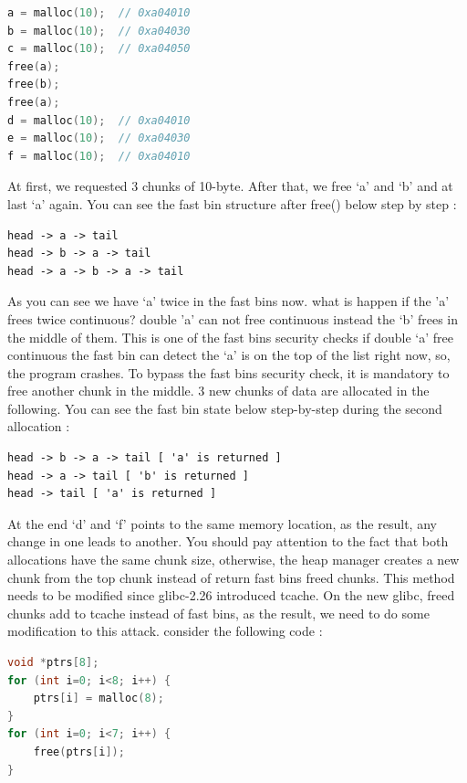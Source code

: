\documentclass{masterthesis}
\newcommand*\libc{glibc}
\begin{document}
\begin{lstlisting}[language=c,frame=tlrb]
a = malloc(10);  // 0xa04010
b = malloc(10);  // 0xa04030
c = malloc(10);  // 0xa04050
free(a);
free(b); 
free(a);
d = malloc(10);  // 0xa04010
e = malloc(10);  // 0xa04030
f = malloc(10);  // 0xa04010
\end{lstlisting}

At first, we requested 3 chunks of 10-byte. After that, we free ‘a’ and ‘b’ and at last ‘a' again. You can see the fast bin structure after free() below step by step :

\begin{lstlisting}[frame=tlrb]
head -> a -> tail
head -> b -> a -> tail
head -> a -> b -> a -> tail
\end{lstlisting}

As you can see we have ‘a’ twice in the fast bins now. what is happen if the 'a' frees twice continuous? double 'a' can not free continuous instead the ‘b’ frees in the middle of them. This is one of the fast bins security checks if double ‘a’ free continuous the fast bin can detect the ‘a’ is on the top of the list right now, so, the program crashes. To bypass the fast bins security check, it is mandatory to free another chunk in the middle. 3 new chunks of data are allocated in the following. You can see the fast bin state below step-by-step during the second allocation :

\begin{lstlisting}[frame=tlrb]
head -> b -> a -> tail [ 'a' is returned ]
head -> a -> tail [ 'b' is returned ]
head -> tail [ 'a' is returned ]
\end{lstlisting}

At the end ‘d’ and ‘f’ points to the same memory location, as the result, any change in one leads to another. You should pay attention to the fact that both allocations have the same chunk size, otherwise, the heap manager creates a new chunk from the top chunk instead of return fast bins freed chunks.
This method needs to be modified since \libc{-2.26} introduced tcache. On the new \libc{}, freed chunks add to tcache instead of fast bins, as the result, we need to do some modification to this attack. consider the following code :

\begin{lstlisting}[language=c,frame=tlrb]
void *ptrs[8];
for (int i=0; i<8; i++) {
	ptrs[i] = malloc(8);
}
for (int i=0; i<7; i++) {
	free(ptrs[i]);
}
\end{lstlisting}
\end{document}
